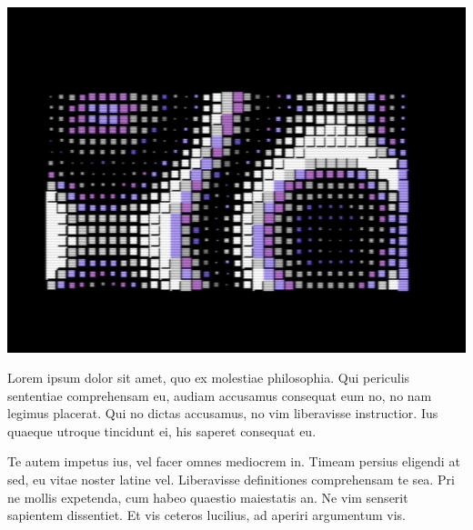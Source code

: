 \begin{minipage}{0.6\textwidth}
\includegraphics{images/c64/06_plasma.png}
\end{minipage}
\begin{minipage}{0.4\textwidth}
Lorem ipsum dolor sit amet, quo ex molestiae philosophia. Qui periculis sententiae comprehensam eu, audiam accusamus consequat eum no, no nam legimus placerat. Qui no dictas accusamus, no vim liberavisse instructior. Ius quaeque utroque tincidunt ei, his saperet consequat eu.
\end{minipage}
Te autem impetus ius, vel facer omnes mediocrem in. Timeam persius eligendi at sed, eu vitae noster latine vel. Liberavisse definitiones comprehensam te sea. Pri ne mollis expetenda, cum habeo quaestio maiestatis an. Ne vim senserit sapientem dissentiet. Et vis ceteros lucilius, ad aperiri argumentum vis.

